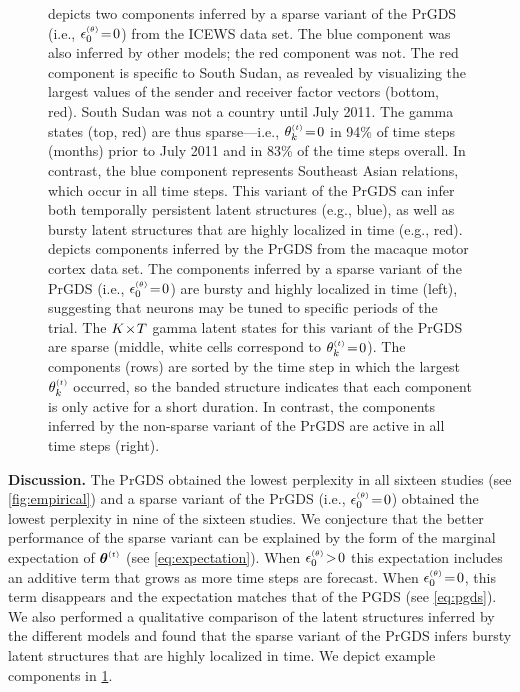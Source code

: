 \documentclass{article}
\begin{document}
\begin{figure}[t]
\caption{\label{fig:exploratory}  depicts two components inferred by a sparse variant of the PrGDS (i.e., $\epstheta \teq 0$) from the ICEWS data set. The blue component was also inferred by other models; the red component was not. The red component is specific to South Sudan, as revealed by visualizing the largest values of the sender and receiver factor vectors (bottom, red). South Sudan was not a country until July 2011. The gamma states (top, red) are thus sparse---i.e., $\thetakt \teq 0$ in 94\% of time steps (months) prior to July 2011 and in 83\% of the time steps overall. In contrast, the blue component represents Southeast Asian relations, which occur in all time steps. This variant of the PrGDS can infer both temporally persistent latent structures (e.g., blue), as well as bursty latent structures that are highly localized in time (e.g., red).  depicts components inferred by the PrGDS from the macaque motor cortex data set. The components inferred by a sparse variant of the PrGDS (i.e., $\epstheta \teq 0$) are bursty and highly localized in time (left), suggesting that neurons may be tuned to specific periods of the trial. The $K \!\times\! T$ gamma latent states for this variant of the PrGDS are sparse (middle, white cells correspond to $\thetakt\teq 0$). The components (rows) are sorted by the time step in which the largest $\thetakt$ occurred, so the banded structure indicates that each component is only active for a short duration. In contrast, the components inferred by the non-sparse variant of the PrGDS are active in all time steps (right).}
\end{figure}

\textbf{Discussion.} The PrGDS obtained the lowest perplexity in all
sixteen studies (see \cref{fig:empirical}) and a sparse variant of the
PrGDS (i.e., $\epstheta \teq 0$) obtained the lowest perplexity in
nine of the sixteen studies. We conjecture that the better performance
of the sparse variant can be explained by the form of the marginal
expectation of $\boldsymbol{\theta}^{\mathsmaller{(t)}}$ (see
\cref{eq:expectation}). When $\epstheta \!>\! 0$ this expectation
includes an additive term that grows as more time steps are
forecast. When $\epstheta \teq 0$, this term disappears and the
expectation matches that of the PGDS (see \cref{eq:pgds}). We also
performed a qualitative comparison of the latent structures inferred
by the different models and found that the sparse variant of the PrGDS
infers bursty latent structures that are highly localized in time. We
depict example components in \cref{fig:exploratory}.
\end{document}
